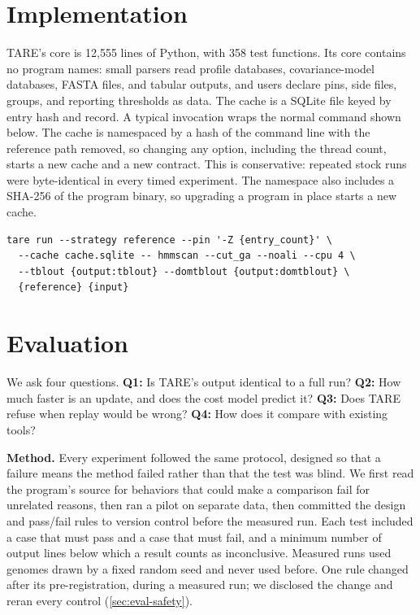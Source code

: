 \documentclass[letterpaper,twocolumn,10pt]{article}
\theoremstyle{definition}
\newcommand{\sys}{TARE\xspace}
\newcommand{\sys}{PARE\xspace}
\begin{document}
\section{Implementation}
\label{sec:impl}

\sys's core is 12{,}555 lines of Python, with 358 test functions. Its core contains no program names: small parsers read
profile databases, covariance\nobreakdash-model databases, FASTA files, and tabular outputs, and users declare pins, side files,
groups, and reporting thresholds as data. The cache is a SQLite file keyed by entry hash and record. A typical
invocation wraps the normal command shown below. The cache is namespaced by a hash of the command line with the
reference path removed, so changing any option, including the thread count, starts a new cache and a new contract.
This is conservative: repeated stock runs were byte\nobreakdash-identical in every timed experiment. The
namespace also includes a SHA-256 of the program binary, so upgrading a program in place starts a new cache.
\begin{lstlisting}
tare run --strategy reference --pin '-Z {entry_count}' \
  --cache cache.sqlite -- hmmscan --cut_ga --noali --cpu 4 \
  --tblout {output:tblout} --domtblout {output:domtblout} \
  {reference} {input}
\end{lstlisting}

\section{Evaluation}
\label{sec:eval}

We ask four questions. \textbf{Q1:} Is \sys's output identical to a full run? \textbf{Q2:} How much faster is an
update, and does the cost model predict it? \textbf{Q3:} Does \sys refuse when replay would be wrong? \textbf{Q4:} How
does it compare with existing tools?

\textbf{Method.} Every experiment followed the same protocol, designed so that a failure means the method failed rather
than that the test was blind. We first read the program's source for behaviors that could make a comparison fail for
unrelated reasons, then ran a pilot on separate data, then committed the design and pass/fail rules to version control
before the measured run. Each test included a case that must pass and a case that must fail, and a minimum number of
output lines below which a result counts as inconclusive. Measured runs used genomes drawn by a fixed random seed and
never used before. One rule changed after its pre\nobreakdash-registration, during a measured run; we disclosed the change and
reran every control (\cref{sec:eval-safety}).
\end{document}
